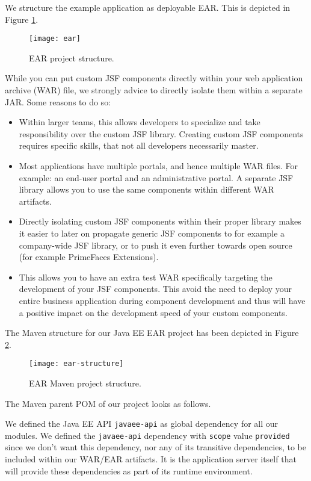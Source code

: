 We structure the example application as deployable EAR. This is depicted in Figure \ref{fig:ear}.
\begin{figure}[htbp]
	\begin{center}
		\texttt{[image: ear]}
		\caption{EAR project structure.}
		\label{fig:ear}
	\end{center}
\end{figure}
While you can put custom JSF components directly within your web application archive (WAR) file,
we strongly advice to directly isolate them within a separate JAR.
Some reasons to do so:
\begin{itemize}
	\item Within larger teams, this allows developers to specialize and take responsibility over the custom JSF library.
	Creating custom JSF components requires specific skills, that not all developers necessarily master.
	\item Most applications have multiple portals, and hence multiple WAR files. For example: an end-user portal and an administrative portal. A separate JSF library allows you to use the same components within different WAR artifacts.
	\item Directly isolating custom JSF components within their proper library makes it easier to later on propagate generic JSF components to for example a company-wide JSF library, or to push it even further towards open source (for example PrimeFaces Extensions).
	\item This allows you to have an extra test WAR specifically targeting the development of your JSF components.
	This avoid the need to deploy your entire business application during component development and thus will have a positive impact on the development speed of your custom components.
\end{itemize}
The Maven structure for our Java EE EAR project has been depicted in Figure \ref{fig:ear-structure}.
\begin{figure}[htbp]
	\begin{center}
		\texttt{[image: ear-structure]}
		\caption{EAR Maven project structure.}
		\label{fig:ear-structure}
	\end{center}
\end{figure}

The Maven parent POM of our project looks as follows.

We defined the Java EE API \texttt{javaee-api} as global dependency for all our modules.
We defined the \texttt{javaee-api} dependency with \texttt{scope} value \texttt{provided} since we don't want this dependency, nor any of its transitive dependencies, to be included within our WAR/EAR artifacts.
It is the application server itself that will provide these dependencies as part of its runtime environment.

